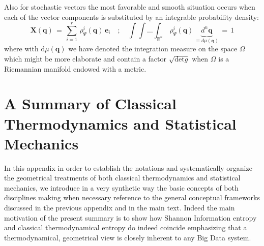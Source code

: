 \documentclass[10pt,a4paper]{article}
\begin{document}
Also for  stochastic vectors the most favorable and smooth situation occurs when
each of the vector components
is substituted by an integrable probability density:
\begin{equation}\label{cherasco}
    \mathbf{X}(\mathbf{q}) \, = \, \sum_{i=1}^r \,
    \rho_\Psi^i(\mathbf{q})\,  \mathbf{e}_i \quad ; \quad
    \int\int\dots\int_{\mathbb{R}^n}\, \rho_\Psi^i(\mathbf{q}) \,
    \underbrace{d^n\mathbf{q} }_{\equiv d\mu(\mathbf{q})}\, = \, 1
\end{equation}
where with  $\mathrm{d}\mu(\mathbf{q})$ we have denoted  the integration
measure on the space $\Omega$ which might be more elaborate and contain a factor
 $\sqrt{\text{det}g}$ when $\Omega$ is a Riemannian manifold endowed with a metric.
\section{A Summary of Classical Thermodynamics and Statistical Mechanics}
\label{richiamatermo} In this appendix in order to establish the notations and systematically organize the  geometrical treatments of both classical thermodynamics and statistical mechanics, we introduce in a very synthetic way the basic concepts of both disciplines
\cite{kersono,ulenbeccus} making when necessary reference to the general conceptual frameworks discussed in the previous appendix and in the main text. Indeed the main motivation of the present summary is to show how Shannon Information entropy and classical thermodynamical entropy do indeed coincide emphasizing that a thermodynamical, geometrical view is closely inherent to any Big Data system.
\end{document}
